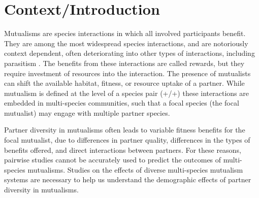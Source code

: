 \documentclass[12pt,a4paper]{article}
\begin{document}
\section*{Context/Introduction}

Mutualisms are species interactions in which all involved participants benefit. They are among the most widespread species interactions\cite{Chamberlain2014,BoucherDouglasH.1985}, and are notoriously context dependent\cite{Bronstein1994,Chamberlain2014,Frederickson2013}, often deteriorating into other types of interactions, including parasitism \cite{Rodriguez-Rodriguez2017,Song2020,Mandyam2014,Thrall2007, Bahia2022}.
The benefits from these interactions are called rewards, but they require investment of resources into the interaction\cite{Bronstein2001}.
The presence of mutualists can shift the available habitat, fitness, or resource uptake of a partner\cite{Stachowicz2001,West2007}.
While mutualism is defined at the level of a species pair (+/+) these interactions are embedded in multi-species communities, such that a focal species (the focal mutualist) may engage with multiple partner species\cite{Stanton2013, Boucher1982}.

Partner diversity in mutualisms often leads to variable fitness benefits for the focal mutualist\cite{Afkhami2014, Palmer2010}, due to differences in partner quality\cite{Bascompte2019,Stanton2013,Frederickson2013,Jones2015, Ness2006}, differences in the types of benefits offered\cite{Kiers2003,Afkhami2014}, and direct interactions between partners\cite{Sun2019,Heath2009,Heath2014,Grutter2003}.
For these reasons, pairwise studies cannot be accurately used to predict the outcomes of multi-species mutualisms\cite{Palmer2010, Stanton2013. Chamberlain2014, Song2020}.
Studies on the effects of diverse multi-species mutualism systems are necessary to help us understand the demographic effects of partner diversity in mutualisms\cite{Bascompte2019}. 
\end{document}
